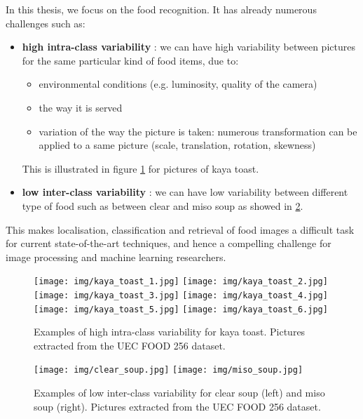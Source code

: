 In this thesis, we focus on the food recognition. It has already numerous challenges such as:
\begin{itemize}
    \item \textbf{high intra-class variability} : we can have high variability between pictures for the same particular kind of food items, due to:
    \begin{itemize}
        \item environmental conditions (e.g. luminosity, quality of the camera)
        \item the way it is served
        \item variation of the way the picture is taken: numerous transformation can be applied to a same picture (scale, translation, rotation, skewness)
    \end{itemize}
    This is illustrated in figure \ref{fig:intra-class_variability} for pictures of kaya toast.
    
    \item \textbf{low inter-class variability} : we can have low variability between different type of food such as between clear and miso soup as showed in \ref{fig:inter-class_variability}.
\end{itemize}

This makes localisation, classification and retrieval of food images a difficult task for current state-of-the-art techniques, and hence a compelling challenge for image processing and machine learning researchers.

\begin{figure}
    \centering
    \texttt{[image: img/kaya\_toast\_1.jpg]}
    \texttt{[image: img/kaya\_toast\_2.jpg]}
    \texttt{[image: img/kaya\_toast\_3.jpg]}
    \texttt{[image: img/kaya\_toast\_4.jpg]}
    \texttt{[image: img/kaya\_toast\_5.jpg]}
    \texttt{[image: img/kaya\_toast\_6.jpg]}
    \caption[Examples of high intra-class variability for kaya toast]{Examples of high intra-class variability for kaya toast. Pictures extracted from the UEC FOOD 256 dataset.}
    \label{fig:intra-class_variability}
\end{figure}

\begin{figure}
    \centering
    \texttt{[image: img/clear\_soup.jpg]}
    \texttt{[image: img/miso\_soup.jpg]}
    \caption[Examples of low inter-class variability for kaya toast]{Examples of low inter-class variability for clear soup (left) and miso soup (right). Pictures extracted from the UEC FOOD 256 dataset.}
    \label{fig:inter-class_variability}
\end{figure}

